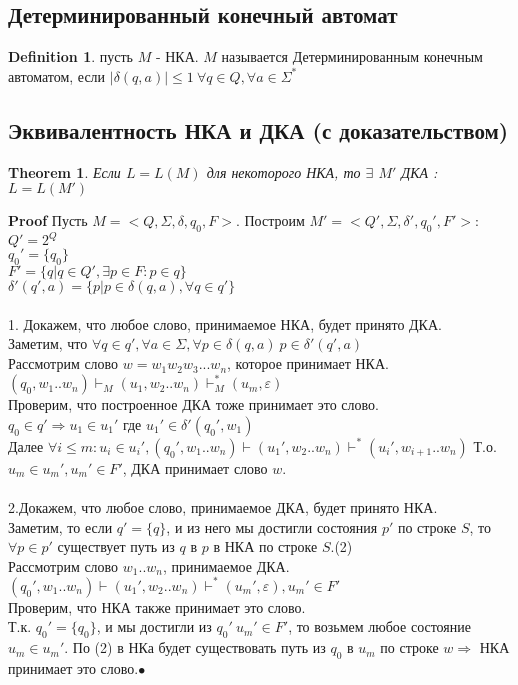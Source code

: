\documentclass[a4paper]{article}
\theoremstyle{plain}
\newtheorem{theorem}{Theorem}
\theoremstyle{remark}
\theoremstyle{definition}
\newtheorem*{definition-star}{Definition}
\renewenvironment{proof}{{\bfseries Proof}}{$\bullet$}
\begin{document}
\subsection{Детерминированный конечный автомат}
\begin{definition-star} пусть $M$ - НКА. $M$ называется Детерминированным конечным автоматом, если $|\delta(q,a)|\le 1 \ \forall q\in Q, \forall a \in \Sigma^*$
\end{definition-star}
\subsection{Эквивалентность НКА и ДКА (с доказательством)}
\begin{theorem} Если $L=L(M)$ для некоторого НКА, то 	$\exists$ $M'$ ДКА : $L=L(M')$
\end{theorem}
\begin{proof} Пусть $M = <Q,\Sigma,\delta,q_0,F>$. Построим $M'=<Q',\Sigma,\delta',q_0',F'>$:\\
$Q'=2^Q$\\
$q_0'=\{q_0\}$\\
$F'=\{q|q \in Q',\exists p\in F: p\in q\}$\\
$\delta'(q',a)=\{p|p\in \delta(q,a),\forall q\in q'\}$\\
\\
1. Докажем, что любое слово, принимаемое НКА, будет принято ДКА.\\
Заметим, что $\forall q \in q', \forall a \in \Sigma, \forall p \in \delta(q,a) \ p \in \delta'(q',a)$\\
Рассмотрим слово $w=w_1w_2w_3...w_n$, которое принимает НКА.\\
$(q_0,w_1..w_n) \vdash_M (u_1,w_2..w_n) \vdash^*_M(u_m,\varepsilon) $\\
Проверим, что  построенное ДКА тоже  принимает это слово.\\
$q_0 \in q' \Rightarrow u_1 \in u_1' $ где $ u_1' \in\delta'(q_0',w_1)$\\
Далее $\forall i \le m:  u_i \in u_i', (q_0',w_1..w_n) \vdash(u_1',w_2..w_n) \vdash^*(u_i',w_{i+1}..w_n)$
Т.о. $u_m \in u_m', u_m' \in F'$, ДКА принимает слово $w$.\\
\\
2.Докажем, что любое слово, принимаемое ДКА, будет принято НКА.\\
Заметим, то если $q'=\{q\}$, и из него мы достигли состояния $p'$ по строке $S$, то  $\forall p \in p'$  существует путь  из $q$ в $p$ в НКА по строке  $S$.(2)\\
Рассмотрим слово $w_1..w_n$, принимаемое ДКА.\\
$(q_0',w_1..w_n) \vdash (u_1',w_2..w_n) \vdash^*(u_m',\varepsilon), u_m' \in F' $\\
Проверим, что НКА также принимает это слово.\\
Т.к. $q_0'=\{q_0\}$,  и мы достигли из $q_0'\  u_m' \in F'$,  то возьмем любое состояние $u_m \in u_m'$. По (2) в НКа будет существовать путь из $q_0$ в $u_m$ по строке $w \Rightarrow$ НКА принимает это слово.\end{proof}
\end{document}
